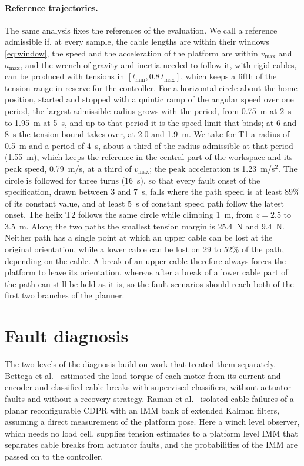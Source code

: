 \documentclass[10pt]{article}
\begin{document}
\paragraph{Reference trajectories.} The same analysis fixes the references of the evaluation. We call a reference admissible if, at every sample, the cable lengths are within their windows \eqref{eq:window}, the speed and the acceleration of the platform are within $v_{\max}$ and $a_{\max}$, and the wrench of gravity and inertia needed to follow it, with rigid cables, can be produced with tensions in $[t_{\min},0.8\,t_{\max}]$, which keeps a fifth of the tension range in reserve for the controller. For a horizontal circle about the home position, started and stopped with a quintic ramp of the angular speed over one period, the largest admissible radius grows with the period, from 0.75~m at 2~s to 1.95~m at 5~s, and up to that period it is the speed limit that binds; at 6 and 8~s the tension bound takes over, at 2.0 and 1.9~m. We take for T1 a radius of 0.5~m and a period of 4~s, about a third of the radius admissible at that period (1.55~m), which keeps the reference in the central part of the workspace and its peak speed, 0.79~m/s, at a third of $v_{\max}$; the peak acceleration is 1.23~m/s$^2$. The circle is followed for three turns (16~s), so that every fault onset of the specification, drawn between 3 and 7~s, falls where the path speed is at least 89\% of its constant value, and at least 5~s of constant speed path follow the latest onset. The helix T2 follows the same circle while climbing 1~m, from $z=2.5$ to 3.5~m. Along the two paths the smallest tension margin is 25.4~N and 9.4~N. Neither path has a single point at which an upper cable can be lost at the original orientation, while a lower cable can be lost on 29 to 52\% of the path, depending on the cable. A break of an upper cable therefore always forces the platform to leave its orientation, whereas after a break of a lower cable part of the path can still be held as it is, so the fault scenarios should reach both of the first two branches of the planner.

\section{Fault diagnosis}\label{sec:fdd}

The two levels of the diagnosis build on work that treated them separately. Bettega et al.\ \citep{bettega2025load} estimated the load torque of each motor from its current and encoder and classified cable breaks with supervised classifiers, without actuator faults and without a recovery strategy. Raman et al.\ \citep{raman2023cable} isolated cable failures of a planar reconfigurable CDPR with an IMM bank of extended Kalman filters, assuming a direct measurement of the platform pose. Here a winch level observer, which needs no load cell, supplies tension estimates to a platform level IMM that separates cable breaks from actuator faults, and the probabilities of the IMM are passed on to the controller.
\end{document}
